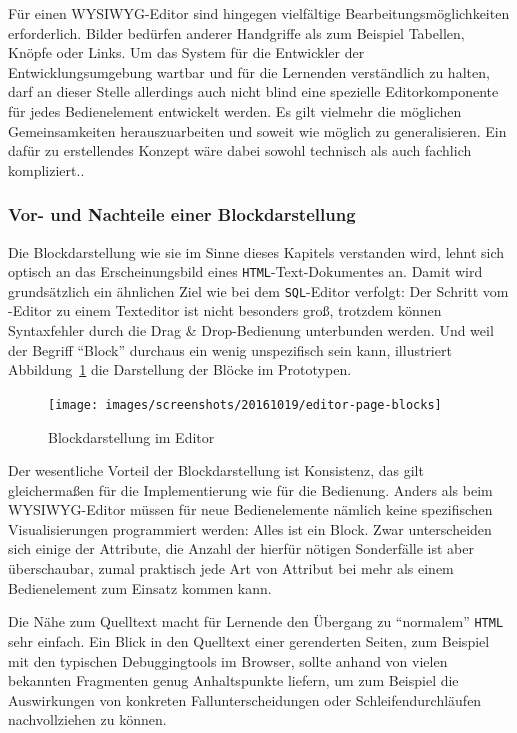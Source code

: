 Für einen WYSIWYG-Editor sind hingegen vielfältige Bearbeitungsmöglichkeiten erforderlich. Bilder bedürfen anderer Handgriffe als zum Beispiel Tabellen, Knöpfe oder Links. Um das System für die Entwickler der Entwicklungsumgebung wartbar und für die Lernenden verständlich zu halten, darf an dieser Stelle allerdings auch nicht blind eine spezielle Editorkomponente für jedes Bedienelement entwickelt werden. Es gilt vielmehr die möglichen Gemeinsamkeiten herauszuarbeiten und soweit wie möglich zu generalisieren. Ein dafür zu erstellendes Konzept wäre dabei sowohl technisch als auch fachlich kompliziert..

\subsubsection{Vor- und Nachteile einer Blockdarstellung}

Die Blockdarstellung wie sie im Sinne dieses Kapitels verstanden wird, lehnt sich optisch an das Erscheinungsbild eines \texttt{HTML}-Text-Dokumentes an. Damit wird grundsätzlich ein ähnlichen Ziel wie bei dem \texttt{SQL}-Editor verfolgt: Der Schritt vom \idename{}-Editor zu einem Texteditor ist nicht besonders groß, trotzdem können Syntaxfehler durch die Drag \& Drop-Bedienung unterbunden werden. Und weil der Begriff "`Block"' durchaus ein wenig unspezifisch sein kann, illustriert Abbildung~\ref{fig:screen-ui-editor-block} die Darstellung der Blöcke im Prototypen.

\begin{figure}[h]
  \texttt{[image: images/screenshots/20161019/editor-page-blocks]}
  \caption{Blockdarstellung im Editor}
  \label{fig:screen-ui-editor-block}
\end{figure}

Der wesentliche Vorteil der Blockdarstellung ist Konsistenz, das gilt gleichermaßen für die Implementierung wie für die Bedienung. Anders als beim WYSIWYG-Editor müssen für neue Bedienelemente nämlich keine spezifischen Visualisierungen programmiert werden: Alles ist ein Block. Zwar unterscheiden sich einige der Attribute, die Anzahl der hierfür nötigen Sonderfälle ist aber überschaubar, zumal praktisch jede Art von Attribut bei mehr als einem Bedienelement zum Einsatz kommen kann.

Die Nähe zum Quelltext macht für Lernende den Übergang zu "`normalem"' \texttt{HTML} sehr einfach. Ein Blick in den Quelltext einer gerenderten Seiten, zum Beispiel mit den typischen Debuggingtools im Browser, sollte anhand von vielen bekannten Fragmenten genug Anhaltspunkte liefern, um zum Beispiel die Auswirkungen von konkreten Fallunterscheidungen oder Schleifendurchläufen nachvollziehen zu können.

